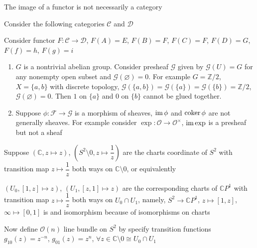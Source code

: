 \documentclass[main]{subfiles}
\begin{document}
\begin{example}
The image of a functor is not necessarily a category \par
Consider the following categories $\mathscr C$ and $\mathscr D$
\begin{center}
\end{center}
\begin{center}
\end{center}
Consider functor $F:\mathscr C\to\mathscr D$, $F(A)=E$, $F(B)=F$, $F(C)=F$, $F(D)=G$, $F(f)=h$, $F(g)=i$
\end{example}

\begin{example}
\begin{enumerate}
\item $G$ is a nontrivial abelian group. Consider presheaf $\mathcal G$ given by $\mathcal G(U)=G$ for any nonempty open subset and $\mathcal G(\varnothing)=0$. For example $G=\mathbb Z/2$, $X=\{a,b\}$ with discrete topology, $\mathcal G(\{a,b\})=\mathcal G(\{a\})=\mathcal G(\{b\})=\mathbb Z/2$, $\mathcal G(\varnothing)=0$. Then $1$ on $\{a\}$ and $0$ on $\{b\}$ cannot be glued together.
\item Suppose $\phi:\mathcal F\to\mathcal G$ is a morphism of sheaves, $\operatorname{im}\phi$ and $\operatorname{coker}\phi$ are not generally sheaves. For example consider $\exp:\mathcal O\to\mathcal O^\times$, $\operatorname{im}\exp$ is a presheaf but not a sheaf
\end{enumerate}
\end{example}

\begin{definition}
Suppose $\left(\mathbb C, z\mapsto z\right)$, $\left(S^2\setminus 0, z\mapsto\dfrac{1}{z}\right)$ are the charts coordinate of $S^2$ with transition map $z\mapsto \dfrac{1}{z}$ both ways on $\mathbb C\setminus 0$, or equivalently \par
$\left(U_0,[1,z]\mapsto z\right)$, $\left(U_1,[z,1]\mapsto z\right)$ are the corresponding charts of $\mathbb CP^1$ with transition map $z\mapsto\dfrac{1}{z}$ both ways on $U_0\cap U_1$, namely, $S^2\to\mathbb CP^1$, $z\mapsto [1,z]$, $\infty\mapsto[0,1]$ is and isomorphism because of isomorphisms on charts \par
Now define $\mathcal{O}(n)$ line bundle on $S^2$ by specify transition functions $g_{10}(z)=z^{-n}$, $g_{01}(z)=z^n$, $\forall z\in \mathbb C\setminus0\cong U_0\cap U_1$ \par
\end{definition}
\end{document}

